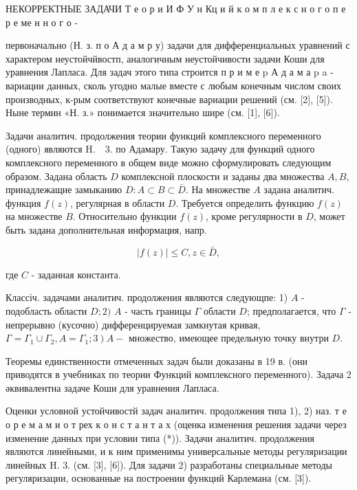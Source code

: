 \documentclass[10pt]{article}
\begin{document}
НЕКОРРЕКТНЫЕ ЗАДАЧИ Т е о р и И Ф У н Кц и й к о м п л е к с н о г о п е р е ме н н о г о -

первоначально (Н. з. п о А д а м р у) задачи для дифференциальных уравнений с характером неустойчйвостп, аналогичным неустойчивости задачи Коши для уравнения Лапласа. Для задач этого типа строится п р и м е p А д а м а p a - вариации данных, сколь угодно малые вместе с любым конечным числом своих производных, к-рым соответствуют конечные вариации решений (см. [2], [5]). Ныне термин «Н. з.» понимается значительно шире (см. [1], [6]).



Задачи аналитич. продолжения теории функций комплексного переменного (одного) являются $\mathrm{H} . \quad 3$. по Адамару. Такую задачу для функций одного комплексного переменного в общем виде можно сформулировать следующим образом. Задана область $D$ комплексной плоскости и заданы два множества $A, B$, принадлежащие замыканию $D: A \subset B \subset \bar{D}$. На множестве $A$ задана аналитич. функция $f(z)$, регулярная в области $D$. Требуется определить функцию $f(z)$ на множестве $B$. Относительно функции $f(z)$, кроме регулярности в $D$, может быть задана дополнительная информация, напр.



\[

|f(z)| \leqslant C, z \in \bar{D},

\]



где $C$ - заданная константа.



Классіч. задачами аналитич. продолжения являются следующпе: 1) $A$ - подобласть области $D ; 2)$ $A$ - часть границы $\Gamma$ области $D$; предполагается, что $\Gamma$ - непрерывно (кусочно) дифференцируемая замкнутая кривая, $\left.\Gamma=\Gamma_{1} \cup \Gamma_{2}, A=\Gamma_{1} ; 3\right) A-$ множество, имеющее предельную точку внутри $D$.



Теоремы единственности отмеченных задач были доказаны в 19 в. (они приводятся в учебниках по теории Функций комплексного переменного). Задача 2 әквивалентна задаче Коши для уравнения Лапласа.



Оценки условной устойчивостй задач аналитич. продолжения типа 1), 2) наз. т е о р е м а м и о т рех к о н с т а н т а х (оценка изменения решения задачи через изменение данных при условии типа (*)). Задачи аналитич. продолжения являются линейными, и к ним применимы универсальные методы регуляризации линейных H. 3. (см. [3], [6]). Для задачи 2) разработаны специальные методы регуляризации, основанные на построении функций Карлемана (см. [3]).
\end{document}
